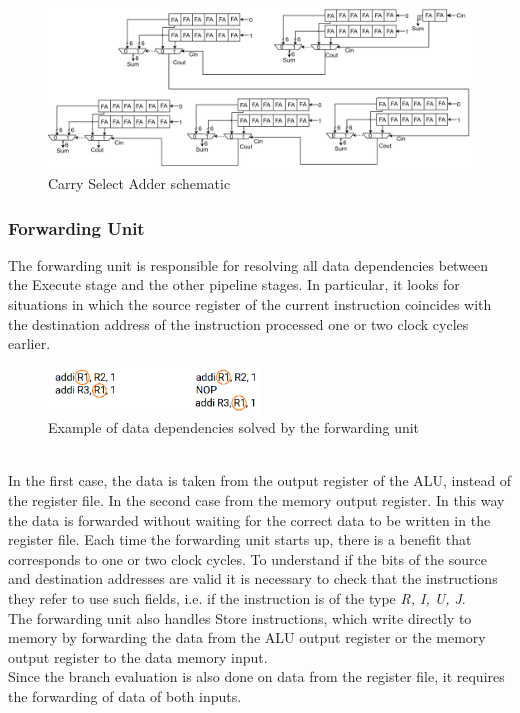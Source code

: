 \begin{figure}[htbp]
	\centering
	\includegraphics[width=1\textwidth]{sec2/images/CSA_full2.png }
	\caption{Carry Select Adder schematic}
	\label{fig:CSA_full}
\end{figure}

\subsubsection{Forwarding Unit}
The forwarding unit is responsible for resolving all data dependencies between the Execute stage and the other pipeline stages. In particular, it looks for situations in which the source register of the current instruction coincides with the destination address of the instruction processed one or two clock cycles earlier.
\begin{figure}[htbp]
	\centering
	\includegraphics[width=0.5\textwidth]{sec2/images/data_dependency.png}
	\caption{Example of data dependencies solved by the forwarding unit}
	\label{fig:zero_skipping}
\end{figure}
\\In the first case, the data is taken from the output register of the ALU, instead of the register file. In the second case from the memory output register. In this way the data is forwarded without waiting for the correct data to be written in the register file. Each time the forwarding unit starts up, there is a benefit that corresponds to one or two clock cycles. To understand if the bits of the source and destination addresses are valid it is necessary to check that the instructions they refer to use such fields, i.e. if the instruction is of the type \textit{R, I, U, J}.\\
The forwarding unit also handles Store instructions, which write directly to memory by forwarding the data from the ALU output register or the memory output register to the data memory input.\\
Since the branch evaluation is also done on data from the register file, it requires the forwarding of data of both inputs.
